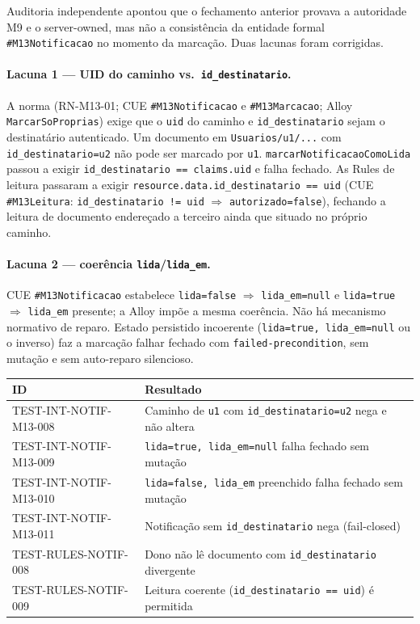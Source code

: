 Auditoria independente apontou que o fechamento anterior provava a autoridade M9
e o server-owned, mas não a consistência da entidade formal \texttt{\#M13Notificacao}
no momento da marcação. Duas lacunas foram corrigidas.

\paragraph{Lacuna 1 --- UID do caminho vs.\ \texttt{id\_destinatario}.}
A norma (RN-M13-01; CUE \texttt{\#M13Notificacao} e \texttt{\#M13Marcacao};
Alloy \texttt{MarcarSoProprias}) exige que o \texttt{uid} do caminho e
\texttt{id\_destinatario} sejam o destinatário autenticado. Um documento em
\texttt{Usuarios/u1/...} com \texttt{id\_destinatario=u2} não pode ser marcado
por \texttt{u1}. \texttt{marcarNotificacaoComoLida} passou a exigir
\texttt{id\_destinatario == claims.uid} e falha fechado. As Rules de leitura
passaram a exigir \texttt{resource.data.id\_destinatario == uid} (CUE
\texttt{\#M13Leitura}: \texttt{id\_destinatario != uid} $\Rightarrow$
\texttt{autorizado=false}), fechando a leitura de documento endereçado a
terceiro ainda que situado no próprio caminho.

\paragraph{Lacuna 2 --- coerência \texttt{lida}/\texttt{lida\_em}.}
CUE \texttt{\#M13Notificacao} estabelece \texttt{lida=false} $\Rightarrow$
\texttt{lida\_em=null} e \texttt{lida=true} $\Rightarrow$ \texttt{lida\_em}
presente; a Alloy impõe a mesma coerência. Não há mecanismo normativo de
reparo. Estado persistido incoerente (\texttt{lida=true, lida\_em=null} ou o
inverso) faz a marcação falhar fechado com \texttt{failed-precondition}, sem
mutação e sem auto-reparo silencioso.

\small
\begin{longtable}{@{}p{}p{}@{}}
\toprule
ID & Resultado \\
\midrule
\endhead
TEST-INT-NOTIF-M13-008 & Caminho de \texttt{u1} com \texttt{id\_destinatario=u2} nega e não altera \\
TEST-INT-NOTIF-M13-009 & \texttt{lida=true, lida\_em=null} falha fechado sem mutação \\
TEST-INT-NOTIF-M13-010 & \texttt{lida=false, lida\_em} preenchido falha fechado sem mutação \\
TEST-INT-NOTIF-M13-011 & Notificação sem \texttt{id\_destinatario} nega (fail-closed) \\
TEST-RULES-NOTIF-008 & Dono não lê documento com \texttt{id\_destinatario} divergente \\
TEST-RULES-NOTIF-009 & Leitura coerente (\texttt{id\_destinatario == uid}) é permitida \\
\bottomrule
\end{longtable}
\normalsize

